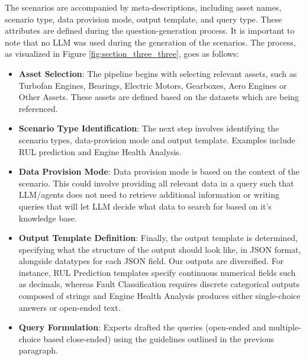 \documentclass[sigconf, screen, nonacm]{acmart}
\begin{document}
The scenarios are accompanied by meta-descriptions, including asset names, scenario type, data provision mode, output template, and query type. These attributes are defined during the question-generation process. It is important to note that no LLM was used during the generation of the scenarios. The process, as visualized in Figure \ref{fig:section_three_three}, goes as follows:
\begin{itemize}
    \item \textbf{Asset Selection}: The pipeline begins with selecting relevant assets, such as Turbofan Engines, Bearings, Electric Motors, Gearboxes, Aero Engines or Other Assets. These assets are defined based on the datasets which are being referenced.
    \item \textbf{Scenario Type Identification}: The next step involves identifying the scenario types, data-provision mode and output template. Examples include RUL prediction and Engine Health Analysis.
    \item \textbf{Data Provision Mode}: Data provision mode is based on the context of the scenario. This could involve providing all relevant data in a query such that LLM/agents does not need to retrieve additional information or writing queries that will let LLM decide what data to search for based on it's knowledge base.
    \item \textbf{Output Template Definition}: Finally, the output template is determined, specifying what the structure of the output should look like, in JSON format, alongside datatypes for each JSON field. Our outputs are diversified. For instance, RUL Prediction templates specify continuous numerical fields such as decimals, whereas Fault Classification requires discrete categorical outputs composed of strings and Engine Health Analysis produces either single-choice answers or open-ended text.
    \item \textbf{Query Formulation}: Experts drafted the queries (open-ended and multiple-choice based close-ended) using the guidelines outlined in the previous paragraph.
\end{itemize}


\end{document}
